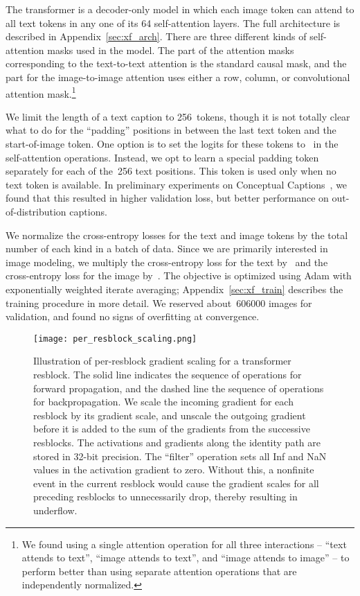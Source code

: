 \documentclass{article}
\begin{document}
The transformer is a decoder-only model in which each image token can attend to all text tokens in any one of its 64 self-attention layers. The full architecture is described in Appendix~\ref{sec:xf_arch}. There are three different kinds of self-attention masks used in the model. The part of the attention masks corresponding to the text-to-text attention is the standard causal mask, and the part for the image-to-image attention uses either a row, column, or convolutional attention mask.\footnote{We found using a single attention operation for all three interactions -- ``text attends to text'', ``image attends to text'', and ``image attends to image'' -- to perform better than using separate attention operations that are independently normalized.} 

We limit the length of a text caption to 256~tokens, though it is not totally clear what to do for the ``padding'' positions in between the last text token and the start-of-image token. One option is to set the logits for these tokens to~ in the self-attention operations. Instead, we opt to learn a special padding token separately for each of the~256 text positions. This token is used only when no text token is available. In preliminary experiments on Conceptual Captions~\cite{sharma2018conceptual}, we found that this resulted in higher validation loss, but better performance on out-of-distribution captions.

We normalize the cross-entropy losses for the text and image tokens by the total number of each kind in a batch of data. Since we are primarily interested in image modeling, we multiply the cross-entropy loss for the text by~ and the cross-entropy loss for the image by~. The objective is optimized using Adam with exponentially weighted iterate averaging; Appendix~\ref{sec:xf_train} describes the training procedure in more detail. We reserved about~\num{606000} images for validation, and found no signs of overfitting at convergence.

\begin{figure}[t]
    \centering
    \texttt{[image: per\_resblock\_scaling.png]}
    \caption{Illustration of per-resblock gradient scaling for a transformer resblock. The solid line indicates the sequence of operations for forward propagation, and the dashed line the sequence of operations for backpropagation. We scale the incoming gradient for each resblock by its gradient scale, and unscale the outgoing gradient before it is added to the sum of the gradients from the successive resblocks. The activations and gradients along the identity path are stored in 32-bit precision. The ``filter'' operation sets all Inf and NaN values in the activation gradient to zero. Without this, a nonfinite event in the current resblock would cause the gradient scales for all preceding resblocks to unnecessarily drop, thereby resulting in underflow.}
    \label{fig:grad_scaling}
\end{figure}
\end{document}
